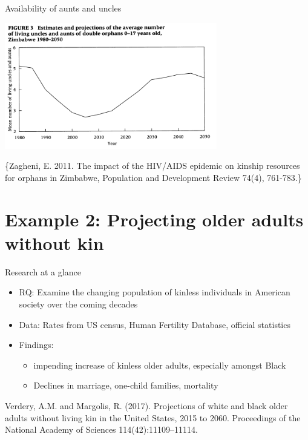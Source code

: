 \documentclass[
  ignorenonframetext,
]{beamer}
\providecommand{\tightlist}{%
  \setlength{\itemsep}{0pt}\setlength{\parskip}{0pt}}
\begin{document}
\begin{frame}{Availability of aunts and uncles}
\protect\hypertarget{availability-of-aunts-and-uncles}{}

\includegraphics[width=3.64583in,height=\textheight]{resources/zag3.PNG}

\tiny\{Zagheni, E. 2011. The impact of the HIV/AIDS epidemic on kinship
resources for orphans in Zimbabwe, Population and Development Review
74(4), 761-783.\}

\end{frame}

\hypertarget{example-2-projecting-older-adults-without-kin}{%
\section{Example 2: Projecting older adults without
kin}\label{example-2-projecting-older-adults-without-kin}}

\begin{frame}{Research at a glance}
\protect\hypertarget{research-at-a-glance-1}{}

\begin{itemize}
\tightlist
\item
  RQ: Examine the changing population of kinless individuals in American
  society over the coming decades
\item
  Data: Rates from US census, Human Fertility Database, official
  statistics
\item
  Findings:

  \begin{itemize}
  \tightlist
  \item
    impending increase of kinless older adults, especially amongst Black
  \item
    Declines in marriage, one-child families, mortality
  \end{itemize}
\end{itemize}

\tiny Verdery, A.M. and Margolis, R. (2017). Projections of white and
black older adults without living kin in the United States, 2015 to
2060. Proceedings of the National Academy of Sciences
114(42):11109--11114.

\end{frame}
\end{document}
